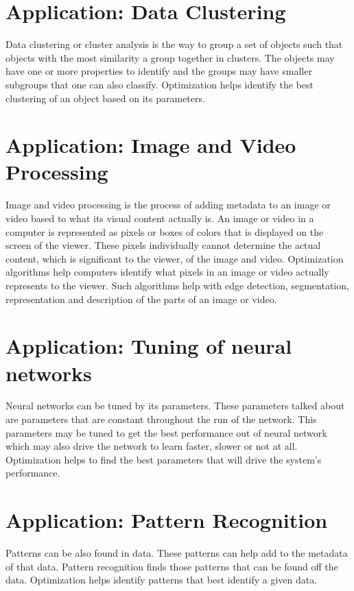 \section{Application: Data Clustering}
Data clustering or cluster analysis is the way to group a set of objects such that objects with the most similarity a group together in clusters. The objects may have one or more properties to identify and the groups may have smaller subgroups that one can also classify. Optimization helps identify the best clustering of an object based on its parameters.

\section{Application: Image and Video Processing}
Image and video processing is the process of adding metadata to an image or video based to what its visual content actually is. An image or video in a computer is represented as pixels or boxes of colors that is displayed on the screen of the viewer. These pixels individually cannot determine the actual content, which is significant to the viewer, of the image and video. Optimization algorithms help computers identify what pixels in an image or video actually represents to the viewer. Such algorithms help with edge detection, segmentation, representation and description of the parts of an image or video.

\section{Application: Tuning of neural networks}
Neural networks can be tuned by its parameters. These parameters talked about are parameters that are constant throughout the run of the network. This parameters may be tuned to get the best performance out of neural network which may also drive the network to learn faster, slower or not at all. Optimization helps to find the best parameters that will drive the system's performance.

\section{Application: Pattern Recognition}
Patterns can be also found in data. These patterns can help add to the metadata of that data. Pattern recognition finds those patterns that can be found off the data. Optimization helps identify patterns that best identify a given data.

